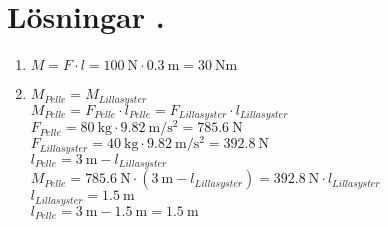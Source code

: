 \documentclass[11pt]{article}
\begin{document}
\section*{Lösningar \thesection.}
\begin{enumerate}[itemsep=2em]
        \item
              \begin{minipage}[t]{0.5\textwidth}
                      $M = F \cdot l = \SI{100}{\newton} \cdot \SI{0.3}{\metre} = \SI{30}{\newton\metre}$
              \end{minipage}
              \hspace{1em}
              \begin{adjustbox}{valign=t}
                      
              \end{adjustbox}
        \item
                            $M_{Pelle} = M_{Lillasyster}$\\
                            $M_{Pelle} = F_{Pelle} \cdot l_{Pelle} = F_{Lillasyster} \cdot l_{Lillasyster}$\\
                            $F_{Pelle} = \SI{80}{\kilogram} \cdot \SI{9.82}{\metre\per\second\squared} = \SI{785.6}{\newton}$\\
                            $F_{Lillasyster} = \SI{40}{\kilogram} \cdot \SI{9.82}{\metre\per\second\squared} = \SI{392.8}{\newton}$\\
                            $l_{Pelle} = \SI{3}{\metre} - l_{Lillasyster}$\\
                            $M_{Pelle} = \SI{785.6}{\newton} \cdot (\SI{3}{\metre} - l_{Lillasyster}) = \SI{392.8}{\newton} \cdot l_{Lillasyster}$\\
                            $l_{Lillasyster} = \SI{1.5}{\metre}$\\
                            $l_{Pelle} = \SI{3}{\metre} - \SI{1.5}{\metre} = \SI{1.5}{\metre}$
                  \begin{adjustbox}{valign=t}
                            
                  \end{adjustbox}
              
\end{enumerate}
\end{document}
